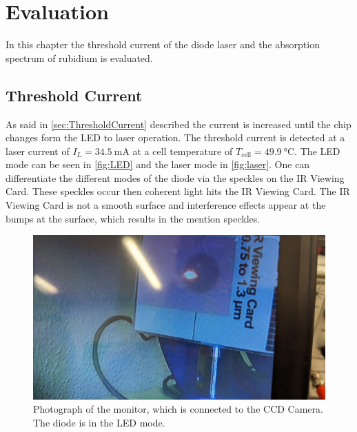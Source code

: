 \section{Evaluation}
\label{sec:auswertung}

In this chapter the threshold current of the diode laser and the absorption spectrum of rubidium is evaluated. 

\subsection{Threshold Current}

As said in \autoref{sec:ThresholdCurrent} described the current is increased until the chip changes form the LED to laser operation.
The threshold current is detected at a laser current of $I_L = \SI{34.5}{\milli\ampere}$ at a cell temperature of $T_\text{cell} = \SI{49.9}{\celsius}$.
The LED mode can be seen in \autoref{fig:LED} and the laser mode in \autoref{fig:laser}. 
One can differentiate the different modes of the diode via the speckles on the IR Viewing Card.
These speckles occur then coherent light hits the IR Viewing Card. 
The IR Viewing Card is not a smooth surface and interference effects appear at the bumps at the surface, which results in the mention speckles.

\begin{figure}[H]
    \centering
    \includegraphics[width=\textwidth]{data/08.pdf}
    \caption{Photograph of the monitor, which is connected to the CCD Camera. The diode is in the LED mode.}
    \label{fig:LED}
\end{figure}

